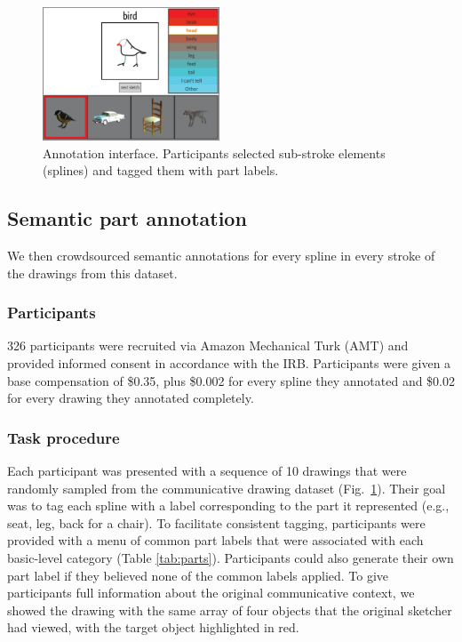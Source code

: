 \documentclass[10pt,letterpaper]{article}
\begin{document}
\begin{figure}[htbp]
\centering
\includegraphics[width=0.47\textwidth]{figures/4_annotation_interface.pdf}
\caption{Annotation interface. Participants selected sub-stroke elements (splines) and tagged them with part labels.} %
\label{annotation_interface}
\vspace{-1em}
\end{figure}

\subsection{Semantic part annotation}

We then crowdsourced semantic annotations for every spline in every stroke of the drawings from this dataset. 

\subsubsection{Participants}
326 participants were recruited via Amazon Mechanical Turk (AMT) and provided informed consent in accordance with the  IRB.  %
Participants were given a base compensation of \$0.35, plus \$0.002 for every spline they annotated and \$0.02 for every drawing they annotated completely. 

\subsubsection{Task procedure}
Each participant was presented with a sequence of 10 drawings that were randomly sampled from the communicative drawing dataset (Fig.~\ref{annotation_interface}). 
Their goal was to tag each spline with a label corresponding to the part it represented (e.g., seat, leg, back for a chair).  
To facilitate consistent tagging, participants were provided with a menu of common part labels that were associated with each basic-level category (Table \ref{tab:parts}).
Participants could also generate their own part label if they believed none of the common labels applied.
To give participants full information about the original communicative context, we showed the drawing with the same array of four objects that the original sketcher had viewed, with the target object highlighted in red. 
\end{document}
